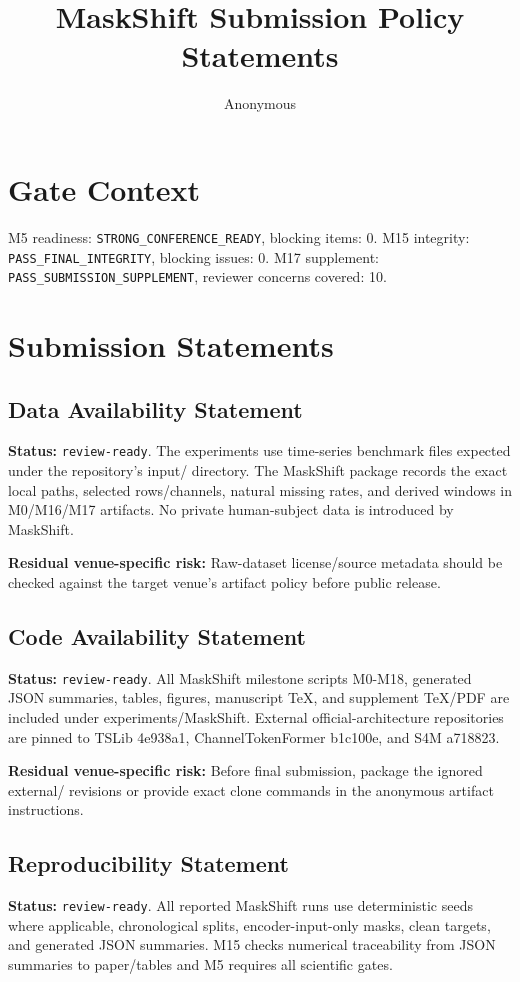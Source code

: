 \documentclass[10pt]{article}
\title{MaskShift Submission Policy Statements}
\author{Anonymous}
\date{}
\begin{document}
\maketitle

\section{Gate Context}
M5 readiness: \texttt{STRONG\_CONFERENCE\_READY}, blocking items: 0. M15 integrity: \texttt{PASS\_FINAL\_INTEGRITY}, blocking issues: 0. M17 supplement: \texttt{PASS\_SUBMISSION\_SUPPLEMENT}, reviewer concerns covered: 10.

\section{Submission Statements}
\subsection{Data Availability Statement}
\textbf{Status:} \texttt{review-ready}. The experiments use time-series benchmark files expected under the repository's input/ directory. The MaskShift package records the exact local paths, selected rows/channels, natural missing rates, and derived windows in M0/M16/M17 artifacts. No private human-subject data is introduced by MaskShift.

\textbf{Residual venue-specific risk:} Raw-dataset license/source metadata should be checked against the target venue's artifact policy before public release.

\subsection{Code Availability Statement}
\textbf{Status:} \texttt{review-ready}. All MaskShift milestone scripts M0-M18, generated JSON summaries, tables, figures, manuscript TeX, and supplement TeX/PDF are included under experiments/MaskShift. External official-architecture repositories are pinned to TSLib 4e938a1, ChannelTokenFormer b1c100e, and S4M a718823.

\textbf{Residual venue-specific risk:} Before final submission, package the ignored external/ revisions or provide exact clone commands in the anonymous artifact instructions.

\subsection{Reproducibility Statement}
\textbf{Status:} \texttt{review-ready}. All reported MaskShift runs use deterministic seeds where applicable, chronological splits, encoder-input-only masks, clean targets, and generated JSON summaries. M15 checks numerical traceability from JSON summaries to paper/tables and M5 requires all scientific gates.
\end{document}
